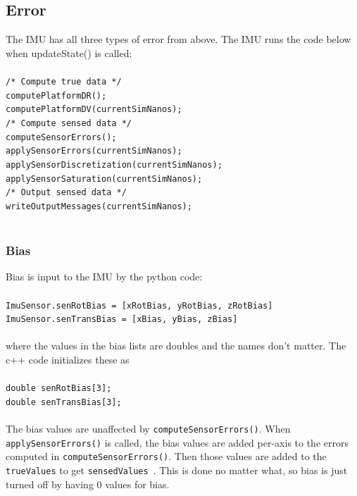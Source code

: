 \documentclass[]{BasiliskReportMemo}
\begin{document}
\subsection{Error}
The IMU has all three types of error from above. The IMU runs the code below when updateState() is called:\\\\
\verb|/* Compute true data */|\\
\verb|computePlatformDR();|\\
\verb|computePlatformDV(currentSimNanos);|\\
\verb|/* Compute sensed data */|\\
\verb|computeSensorErrors();|\\
\verb|applySensorErrors(currentSimNanos);|\\
\verb|applySensorDiscretization(currentSimNanos);|\\
\verb|applySensorSaturation(currentSimNanos);|\\
\verb|/* Output sensed data */|\\
\verb|writeOutputMessages(currentSimNanos);|\\\\

\subsubsection{Bias}
Bias is input to the IMU by the python code:\\\\
\verb|ImuSensor.senRotBias = [xRotBias, yRotBias, zRotBias]|\\
\verb|ImuSensor.senTransBias = [xBias, yBias, zBias]|\\\\
where the values in the bias lists are doubles and the names don't matter.
The c++ code initializes these as \\\\
\verb|double senRotBias[3]; |\\
\verb|double senTransBias[3]; |\\\\
The bias values are unaffected by \verb|computeSensorErrors()|. When  \verb|applySensorErrors()| is called, the bias values are added per-axis to the errors computed in \verb|computeSensorErrors()|. Then those values are added to the \verb|trueValues| to get \verb|sensedValues |. This is done no matter what, so bias is just turned off by having 0 values for bias.
\end{document}
